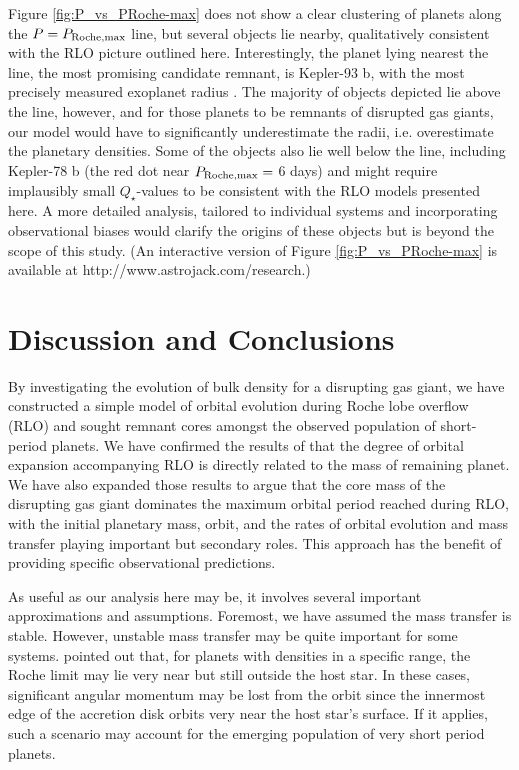 \documentclass{svjour3}                     %
\begin{document}
Figure \ref{fig:P_vs_PRoche-max} does not show a clear clustering of planets along the $P = P_{\rm Roche, max}$ line, but several objects lie nearby, qualitatively consistent with the RLO picture outlined here. Interestingly, the planet lying nearest the line, the most promising candidate remnant, is Kepler-93 b, with the most precisely measured exoplanet radius \cite{2014ApJ...790...12B}. The majority of objects depicted lie above the line, however, and for those planets to be remnants of disrupted gas giants, our model would have to significantly underestimate the radii, i.e. overestimate the planetary densities. Some of the objects also lie well below the line, including Kepler-78 b (the red dot near $P_{\rm Roche, max} =$ 6 days) and might require implausibly small $Q_\star$-values to be consistent with the RLO models presented here. A more detailed analysis, tailored to individual systems and incorporating observational biases would clarify the origins of these objects but is beyond the scope of this study. (An interactive version of Figure \ref{fig:P_vs_PRoche-max} is available at http://www.astrojack.com/research.)

\section{Discussion and Conclusions}
\label{sec:Discussion_and_Conclusions}
By investigating the evolution of bulk density for a disrupting gas giant, we have constructed a simple model of orbital evolution during Roche lobe overflow (RLO) and sought remnant cores amongst the observed population of short-period planets. We have confirmed the results of \cite{2015ApJ...813..101V} that the degree of orbital expansion accompanying RLO is directly related to the mass of remaining planet. We have also expanded those results to argue that the core mass of the disrupting gas giant dominates the maximum orbital period reached during RLO, with the initial planetary mass, orbit, and the rates of orbital evolution and mass transfer playing important but secondary roles. This approach has the benefit of providing specific observational predictions.

As useful as our analysis here may be, it involves several important approximations and assumptions. Foremost, we have assumed the mass transfer is stable. However, unstable mass transfer may be quite important for some systems. \cite{} pointed out that, for planets with densities in a specific range, the Roche limit may lie very near but still outside the host star. In these cases, significant angular momentum may be lost from the orbit since the innermost edge of the accretion disk orbits very near the host star's surface. If it applies, such a scenario may account for the emerging population of very short period planets. 
\end{document}
